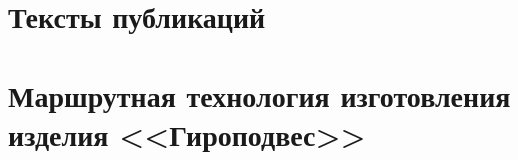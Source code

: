 \chapter{Тексты публикаций}\label{app:A}

\clearpage











\chapter{Маршрутная технология изготовления изделия <<Гироподвес>>}\label{app:B}

\clearpage




